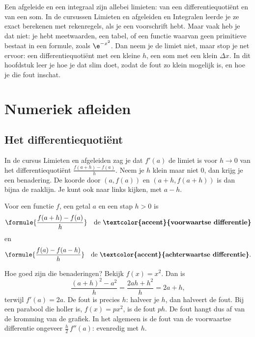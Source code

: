 Een afgeleide en een integraal zijn allebei limieten: van een differentiequotiënt en van een som. In de cursussen Limieten en afgeleiden en Integralen leerde je ze exact berekenen met rekenregels, als je een voorschrift hebt. Maar vaak heb je dat niet: je hebt meetwaarden, een tabel, of een functie waarvan geen primitieve bestaat in een formule, zoals $\e^{-x^2}$. Dan neem je de limiet niet, maar stop je net ervoor: een differentiequotiënt met een kleine $h$, een som met een klein $\Delta x$. In dit hoofdstuk leer je hoe je dat slim doet, zodat de fout zo klein mogelijk is, en hoe je die fout inschat.

\begin{oefeningen}[Start]

\end{oefeningen}


\section{Numeriek afleiden}

\subsection{Het differentiequotiënt}

In de cursus Limieten en afgeleiden zag je dat $f'(a)$ de limiet is voor $h \to 0$ van het differentiequotiënt $\tfrac{f(a + h) - f(a)}{h}$. Neem je $h$ klein maar niet 0, dan krijg je een benadering. De koorde door $(a, f(a))$ en $(a + h, f(a + h))$ is dan bijna de raaklijn. Je kunt ook naar links kijken, met $a - h$.

\begin{theorie}
Voor een functie $f$, een getal $a$ en een stap $h > 0$ is
\[
\formule{\frac{f(a + h) - f(a)}{h}} \quad \text{de \textbf{\textcolor{accent}{voorwaartse differentie}}}
\]
en
\[
\formule{\frac{f(a) - f(a - h)}{h}} \quad \text{de \textbf{\textcolor{accent}{achterwaartse differentie}}.}
\]
\end{theorie}

Hoe goed zijn die benaderingen? Bekijk $f(x) = x^2$. Dan is
\[
\frac{(a + h)^2 - a^2}{h} = \frac{2ah + h^2}{h} = 2a + h ,
\]
terwijl $f'(a) = 2a$. De fout is precies $h$: halveer je $h$, dan halveert de fout. Bij een parabool die holler is, $f(x) = px^2$, is de fout $ph$. De fout hangt dus af van de kromming van de grafiek. In het algemeen is de fout van de voorwaartse differentie ongeveer $\frac{h}{2}\,f''(a)$: evenredig met $h$.

